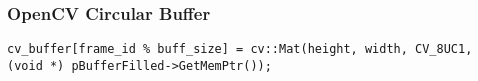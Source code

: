\subsubsection{OpenCV Circular Buffer}
\label{subsubsec:opencv_buffer}



\begin{lstlisting}[style=C++]
  cv_buffer[frame_id % buff_size] = cv::Mat(height, width, CV_8UC1, (void *) pBufferFilled->GetMemPtr());
\end{lstlisting}
